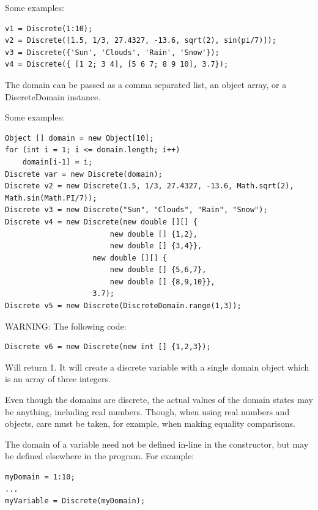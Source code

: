 Some examples:

\begin{lstlisting}
v1 = Discrete(1:10);
v2 = Discrete([1.5, 1/3, 27.4327, -13.6, sqrt(2), sin(pi/7)]);
v3 = Discrete({'Sun', 'Clouds', 'Rain', 'Snow'});
v4 = Discrete({ [1 2; 3 4], [5 6 7; 8 9 10], 3.7});
\end{lstlisting}

\fi


\ifjava

The domain can be passed as a comma separated list, an object array, or a DiscreteDomain instance.

Some examples:

\begin{lstlisting}
Object [] domain = new Object[10];
for (int i = 1; i <= domain.length; i++)
	domain[i-1] = i;
Discrete var = new Discrete(domain);
Discrete v2 = new Discrete(1.5, 1/3, 27.4327, -13.6, Math.sqrt(2), Math.sin(Math.PI/7));
Discrete v3 = new Discrete("Sun", "Clouds", "Rain", "Snow");
Discrete v4 = new Discrete(new double [][] {
						new double [] {1,2},
						new double [] {3,4}}, 
					new double [][] {
						new double [] {5,6,7},
						new double [] {8,9,10}},
					3.7);
Discrete v5 = new Discrete(DiscreteDomain.range(1,3));
\end{lstlisting}

WARNING:  The following code:

\begin{lstlisting}
Discrete v6 = new Discrete(new int [] {1,2,3});
\end{lstlisting}

Will return 1.  It will create a discrete variable with a single domain object which is an array of three integers.

\fi

Even though the domains are discrete, the actual values of the domain states may be anything, including real numbers.  Though, when using real numbers and objects, care must be taken, for example, when making equality comparisons.

The domain of a variable need not be defined in-line in the constructor, but may be defined elsewhere in the program.  For example:

\ifmatlab

\begin{lstlisting}
myDomain = 1:10;
...
myVariable = Discrete(myDomain);
\end{lstlisting}

\fi

